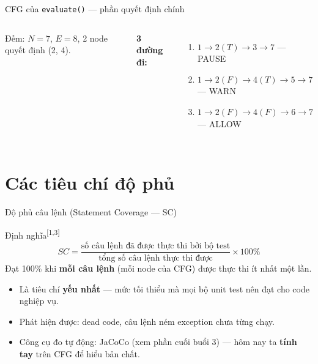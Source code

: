 \documentclass[aspectratio=169,12pt]{beamer}
\newcommand{\sref}[1]{\textsuperscript{\scriptsize[#1]}}
\begin{document}
\begin{frame}[shrink=8]{CFG của \texttt{evaluate()} --- phần quyết định chính}
\begin{columns}
    \vspace{0.4em}
    \small
    Đếm: $N = 7$, $E = 8$, 2 node quyết định (2, 4).

    \vspace{0.2em}
    \textbf{3 đường đi:}
    \begin{enumerate}
      \item $1{\to}2(T){\to}3{\to}7$ --- PAUSE
      \item $1{\to}2(F){\to}4(T){\to}5{\to}7$ --- WARN
      \item $1{\to}2(F){\to}4(F){\to}6{\to}7$ --- ALLOW
    \end{enumerate}
  \end{columns}
\end{frame}

\section{Các tiêu chí độ phủ}

\begin{frame}{Độ phủ câu lệnh (Statement Coverage --- SC)}
  \begin{block}{Định nghĩa\sref{1,3}}
    \[
      SC = \frac{\text{số câu lệnh đã được thực thi bởi bộ test}}
                {\text{tổng số câu lệnh thực thi được}} \times 100\%
    \]
    Đạt 100\% khi \textbf{mỗi câu lệnh} (mỗi node của CFG) được thực thi
    ít nhất một lần.
  \end{block}

  \vspace{0.4em}
  \begin{itemize}
    \item Là tiêu chí \textbf{yếu nhất} --- mức tối thiểu mà mọi bộ unit test
      nên đạt cho code nghiệp vụ.
    \item Phát hiện được: dead code, câu lệnh ném exception chưa từng chạy.
    \item Công cụ đo tự động: JaCoCo (xem phần cuối buổi 3) --- hôm nay ta \textbf{tính tay}
      trên CFG để hiểu bản chất.
  \end{itemize}
\end{frame}
\end{document}
